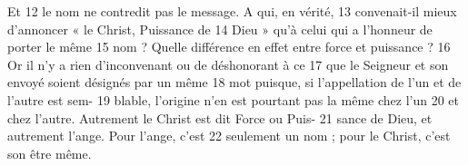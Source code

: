 Et	 
12	 	le nom ne contredit pas le message. A qui, en vérité,	 
13	 	convenait-il mieux d'annoncer « le Christ, Puissance de	 
14	 	Dieu » qu'à celui qui a l'honneur de porter le même	 
15	 	nom ? Quelle différence en effet entre force et puissance ?	 
16	 	Or il n'y a rien d'inconvenant ou de déshonorant à ce	 
17	 	que le Seigneur et son envoyé soient désignés par un même	 
18	 	mot puisque, si l'appellation de l'un et de l'autre est sem-	 
19	 	blable, l'origine n'en est pourtant pas la même chez l'un	 
20	 	et chez l'autre. Autrement le Christ est dit Force ou Puis-	 
21	 	sance de Dieu, et autrement l'ange. Pour l'ange, c'est	 
22	 	seulement un nom ; pour le Christ, c'est son être même.